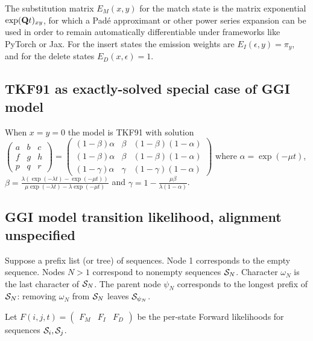 \documentclass{article}
\begin{document}
The substitution matrix $E_M(x,y)$ for the match state is
the matrix exponential $\exp({\bf Q}t)_{xy}$, for which a Pad\'{e} approximant
or other power series expansion can be used in order to remain automatically differentiable under frameworks like PyTorch or Jax. %
For the insert states the emission weights are $E_I(\epsilon,y)=\pi_y$,
and for the delete states $E_D(x,\epsilon)=1$.

\subsection{TKF91 as exactly-solved special case of GGI model}

When $x=y=0$ the model is TKF91 \cite{ThorneEtAl91}
with solution
$
\begin{pmatrix}
a & b & c \\
f & g & h \\
p & q & r 
\end{pmatrix}
=
\begin{pmatrix}
(1-\beta)\alpha & \beta & (1-\beta)(1-\alpha) \\
(1-\beta)\alpha & \beta & (1-\beta)(1-\alpha) \\
(1-\gamma)\alpha & \gamma & (1-\gamma)(1-\alpha)
\end{pmatrix}
$
where
$\alpha = \exp(-\mu t)$,
$\beta = \frac{\lambda \left( \exp(-\lambda t) - \exp(-\mu t) \right)}{\mu \exp(-\lambda t) - \lambda \exp(-\mu t)}$
and
$\gamma = 1 - \frac{\mu \beta}{\lambda (1 - \alpha)}$.



\subsection{GGI model transition likelihood, alignment unspecified}

Suppose a prefix list (or tree) of sequences.
Node 1 corresponds to the empty sequence.
Nodes $N>1$ correspond to nonempty sequences ${\cal S}_N$.
Character $\omega_N$ is the last character of ${\cal S}_N$.
The parent node $\psi_N$ corresponds to the longest prefix of ${\cal S}_N$:
removing $\omega_N$ from ${\cal S}_N$ leaves ${\cal S}_{\psi_N}$.

Let $F(i,j,t) = \begin{pmatrix} F_M & F_I & F_D \end{pmatrix}$
be the per-state Forward likelihoods for sequences ${\cal S}_i,{\cal S}_j$.
\end{document}
